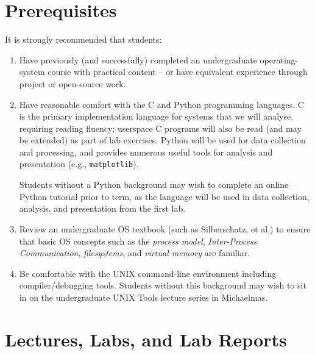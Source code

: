 \documentclass[a4paper,10pt]{article}
\begin{document}
\section{Prerequisites}

It is strongly recommended that students:

\begin{enumerate}
\item Have previously (and successfully) completed an undergraduate
  operating-system course with practical content -- or have equivalent
  experience through project or open-source work.
\item Have reasonable comfort with the C and Python programming languages.
  C is the primary implementation language for systems that we will analyse,
  requiring reading fluency; userspace C programs will also be read (and may
  be extended) as part of lab exercises.
  Python will be used for data collection and processing, and provides
  numerous useful tools for analysis and presentation (e.g.,
  \texttt{matplotlib}).

  Students without a Python background may wish to complete an online Python
  tutorial prior to term, as the language will be used in data collection,
  analysis, and presentation from the first lab.
\item Review an undergraduate OS textbook (such as Silberschatz, et al.) to
  ensure that basic OS concepts such as the \textit{process model},
  \textit{Inter-Process Communication}, \textit{filesystems}, and
  \textit{virtual memory} are familiar.
\item Be comfortable with the UNIX command-line environment including
  compiler/debugging tools.
  Students without this background may wish to sit in on the undergraduate
  UNIX Tools lecture series in Michaelmas.
\end{enumerate}

\section{Lectures, Labs, and Lab Reports}
\end{document}

